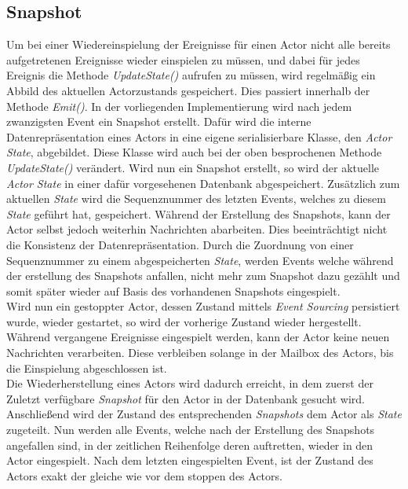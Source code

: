 \subsection{Snapshot}
\label{subsec:implementation:eventSouring:Snapshot}
Um bei einer Wiedereinspielung der Ereignisse für einen Actor nicht alle bereits aufgetretenen Ereignisse  wieder einspielen zu müssen, und dabei für jedes Ereignis die Methode \textit{UpdateState()} aufrufen zu müssen, wird regelmäßig ein Abbild des aktuellen Actorzustands gespeichert. Dies passiert innerhalb der Methode \textit{Emit()}. In der vorliegenden Implementierung wird nach jedem zwanzigsten Event ein Snapshot erstellt. Dafür wird die interne Datenrepräsentation eines Actors in eine eigene serialisierbare Klasse, den \textit{Actor State}, abgebildet. Diese Klasse wird auch bei der oben besprochenen Methode \textit{UpdateState()} verändert. Wird nun ein Snapshot erstellt, so wird der aktuelle \textit{Actor State} in einer dafür vorgesehenen Datenbank abgespeichert. Zusätzlich zum aktuellen \textit{State} wird die Sequenznummer des letzten Events, welches zu diesem \textit{State} geführt hat, gespeichert. Während der Erstellung des Snapshots, kann der Actor selbst jedoch weiterhin Nachrichten abarbeiten. Dies beeinträchtigt nicht die Konsistenz der Datenrepräsentation. Durch die Zuordnung von einer Sequenznummer zu einem abgespeicherten \textit{State}, werden Events welche während der erstellung des Snapshots anfallen, nicht mehr zum Snapshot dazu gezählt und somit später wieder auf Basis des vorhandenen Snapshots eingespielt. \\
Wird nun ein gestoppter Actor, dessen Zustand mittels \textit{Event Sourcing} persistiert wurde, wieder gestartet, so wird der vorherige Zustand wieder hergestellt. Während vergangene Ereignisse eingespielt werden, kann der Actor keine neuen Nachrichten verarbeiten. Diese verbleiben solange in der Mailbox des Actors, bis die Einspielung abgeschlossen ist. \\
Die Wiederherstellung eines Actors wird dadurch erreicht, in dem zuerst der Zuletzt verfügbare \textit{Snapshot} für den Actor in der Datenbank gesucht wird. Anschließend wird der Zustand des entsprechenden \textit{Snapshots} dem Actor als \textit{State} zugeteilt. Nun werden alle Events, welche nach der Erstellung des Snapshots angefallen sind, in der zeitlichen Reihenfolge deren auftretten, wieder in den Actor eingespielt. Nach dem letzten eingespielten Event, ist der Zustand des Actors exakt der gleiche wie vor dem stoppen des Actors.

